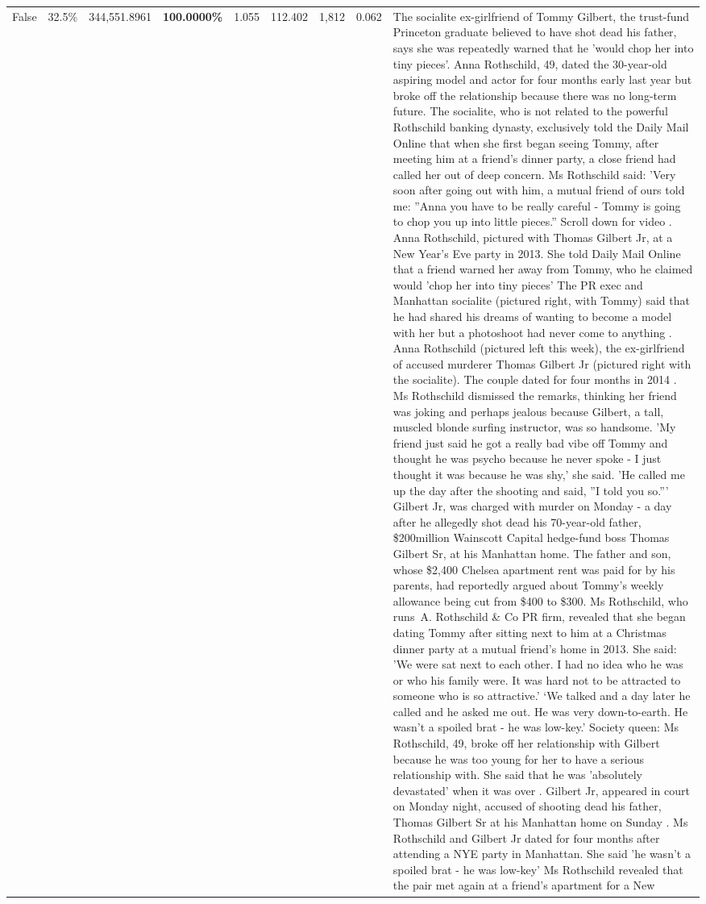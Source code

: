 \begin{table}[H]
\begin{tabular}{lllrlllll}
False & 32.5\% & 344,551.8961 & \bfseries \color{red} 100.0000\% & 1.055 & 112.402 & 1,812 & 0.062 & The socialite ex-girlfriend of Tommy Gilbert, the trust-fund Princeton graduate believed to have shot dead his father, says she was repeatedly warned that he 'would chop her into tiny pieces'. Anna Rothschild, 49, dated the 30-year-old aspiring model and actor for four months early last year but broke off the relationship because there was no long-term future. The socialite, who is not related to the powerful Rothschild banking dynasty, exclusively told the Daily Mail Online that when she first began seeing Tommy, after meeting him at a friend's dinner party, a close friend had called her out of deep concern. Ms Rothschild said: 'Very soon after going out with him, a mutual friend of ours told me: ''Anna you have to be really careful - Tommy is going to chop you up into little pieces.'' Scroll down for video . Anna Rothschild, pictured with Thomas Gilbert Jr, at a New Year's Eve party in 2013. She told Daily Mail Online that a friend warned her away from Tommy, who he claimed would 'chop her into tiny pieces' The PR exec and Manhattan socialite (pictured right, with Tommy) said that he had shared his dreams of wanting to become a model with her but a photoshoot had never come to anything . Anna Rothschild (pictured left this week), the ex-girlfriend of accused murderer Thomas Gilbert Jr (pictured right with the socialite). The couple dated for four months in 2014 . Ms Rothschild dismissed the remarks, thinking her friend was joking and perhaps jealous because Gilbert, a tall, muscled blonde surfing instructor, was so handsome. 'My friend just said he got a really bad vibe off Tommy and thought he was psycho because he never spoke - I just thought it was because he was shy,' she said. 'He called me up the day after the shooting and said, ''I told you so.''' Gilbert Jr, was charged with murder on Monday - a day after he allegedly shot dead his 70-year-old father, \$200million Wainscott Capital hedge-fund boss Thomas Gilbert Sr, at his Manhattan home. The father and son, whose \$2,400 Chelsea apartment rent was paid for by his parents, had reportedly argued about Tommy's weekly allowance being cut from \$400 to \$300. Ms Rothschild, who runs A. Rothschild \& Co PR firm, revealed that she began dating Tommy after sitting next to him at a Christmas dinner party at a mutual friend's home in 2013. She said: 'We were sat next to each other. I had no idea who he was or who his family were. It was hard not to be attracted to someone who is so attractive.' ‘We talked and a day later he called and he asked me out. He was very down-to-earth. He wasn’t a spoiled brat - he was low-key.’ Society queen: Ms Rothschild, 49, broke off her relationship with Gilbert because he was too young for her to have a serious relationship with. She said that he was 'absolutely devastated' when it was over . Gilbert Jr, appeared in court on Monday night, accused of shooting dead his father, Thomas Gilbert Sr at his Manhattan home on Sunday . Ms Rothschild and Gilbert Jr dated for four months after attending a NYE party in Manhattan. She said 'he wasn't a spoiled brat - he was low-key' Ms Rothschild revealed that the pair met again at a friend’s apartment for a New 
\end{tabular}
\end{table}
